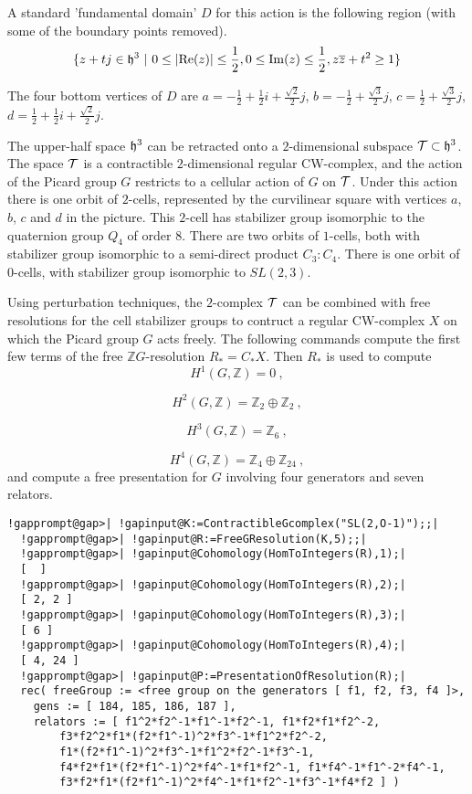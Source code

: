 \documentclass[a4paper,11pt]{report}
\begin{document}
{{A standard 'fundamental domain' $D$ for this action is the following region (with some of the boundary points
removed). 
\[ \{z+tj\in {\frak h}^3\ |\ 0 \le |{\rm Re}(z)| \le \frac{1}{2}, 0\le {\rm
Im}(z) \le \frac{1}{2}, z\overline z +t^2 \ge 1\} \]
  

The four bottom vertices of $D$ are $a = -\frac{1}{2} +\frac{1}{2}i +\frac{\sqrt{2}}{2}j$, $b = -\frac{1}{2} +\frac{\sqrt{3}}{2}j$, $c = \frac{1}{2} +\frac{\sqrt{3}}{2}j$, $d = \frac{1}{2} +\frac{1}{2}i +\frac{\sqrt{2}}{2}j$. 

The upper-half space ${\frak h}^3$ can be retracted onto a $2$-dimensional subspace ${\cal T} \subset {\frak h}^3$. The space ${\cal T}$ is a contractible $2$-dimensional regular CW-complex, and the action of the Picard group $G$ restricts to a cellular action of $G$ on ${\cal T}$. Under this action there is one orbit of $2$-cells, represented by the curvilinear square with vertices $a$, $b$, $c$ and $d$ in the picture. This $2$-cell has stabilizer group isomorphic to the quaternion group $Q_4$ of order $8$. There are two orbits of $1$-cells, both with stabilizer group isomorphic to a semi-direct product $C_3:C_4$. There is one orbit of $0$-cells, with stabilizer group isomorphic to $SL(2,3)$. 

Using perturbation techniques, the $2$-complex ${\cal T}$ can be combined with free resolutions for the cell stabilizer groups to
contruct a regular CW-complex $X$ on which the Picard group $G$ acts freely. The following commands compute the first few terms of the free $\mathbb ZG$-resolution $R_\ast =C_\ast X$. Then $R_\ast$ is used to compute 
\[H^1(G,\mathbb Z) =0\ ,\]
 
\[H^2(G,\mathbb Z) =\mathbb Z_2\oplus \mathbb Z_2\ ,\]
 
\[H^3(G,\mathbb Z) =\mathbb Z_6\ ,\]
 
\[H^4(G,\mathbb Z) =\mathbb Z_4\oplus \mathbb Z_{24}\ ,\]
 and compute a free presentation for $G$ involving four generators and seven relators. 
\begin{Verbatim}[commandchars=!@|,fontsize=\small,frame=single,label=Example]
  !gapprompt@gap>| !gapinput@K:=ContractibleGcomplex("SL(2,O-1)");;|
  !gapprompt@gap>| !gapinput@R:=FreeGResolution(K,5);;|
  !gapprompt@gap>| !gapinput@Cohomology(HomToIntegers(R),1);|
  [  ]
  !gapprompt@gap>| !gapinput@Cohomology(HomToIntegers(R),2);|
  [ 2, 2 ]
  !gapprompt@gap>| !gapinput@Cohomology(HomToIntegers(R),3);|
  [ 6 ]
  !gapprompt@gap>| !gapinput@Cohomology(HomToIntegers(R),4);|
  [ 4, 24 ]
  !gapprompt@gap>| !gapinput@P:=PresentationOfResolution(R);|
  rec( freeGroup := <free group on the generators [ f1, f2, f3, f4 ]>, 
    gens := [ 184, 185, 186, 187 ], 
    relators := [ f1^2*f2^-1*f1^-1*f2^-1, f1*f2*f1*f2^-2, 
        f3*f2^2*f1*(f2*f1^-1)^2*f3^-1*f1^2*f2^-2, 
        f1*(f2*f1^-1)^2*f3^-1*f1^2*f2^-1*f3^-1, 
        f4*f2*f1*(f2*f1^-1)^2*f4^-1*f1*f2^-1, f1*f4^-1*f1^-2*f4^-1, 
        f3*f2*f1*(f2*f1^-1)^2*f4^-1*f1*f2^-1*f3^-1*f4*f2 ] )
  

\end{Verbatim}}}
\end{document}

